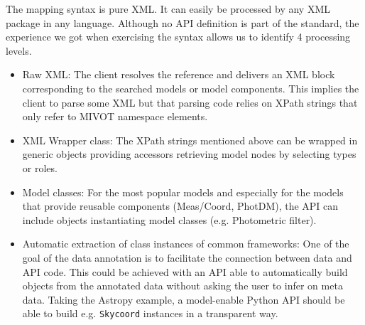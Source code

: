 The mapping syntax is pure XML. It can easily be processed by any XML package in any language.
Although no API definition is part of the standard, the experience we got when exercising the syntax allows us to identify 
4 processing levels.


\begin{itemize} 
  \item Raw XML: The client resolves the reference and delivers an XML block corresponding to the searched models or model components. 
          This implies the client to parse some XML but that parsing code relies on XPath strings that only refer to MIVOT namespace elements.
  \item XML Wrapper class: The XPath strings mentioned above can be wrapped in generic objects providing accessors retrieving model nodes by selecting types or roles. 
  \item Model classes: For the most popular models and especially for the models that provide reusable components (Meas/Coord, PhotDM), the API can include objects instantiating model classes (e.g. Photometric filter).
  \item Automatic extraction of class instances of common frameworks: One of the goal of the data annotation is to facilitate the connection between data and API code. This could be achieved with an API able to automatically build objects from the annotated data without asking the user to infer on meta data. Taking the Astropy example, a model-enable Python API should be able to build e.g. \texttt{Skycoord} instances in a transparent way.
 \end{itemize}

